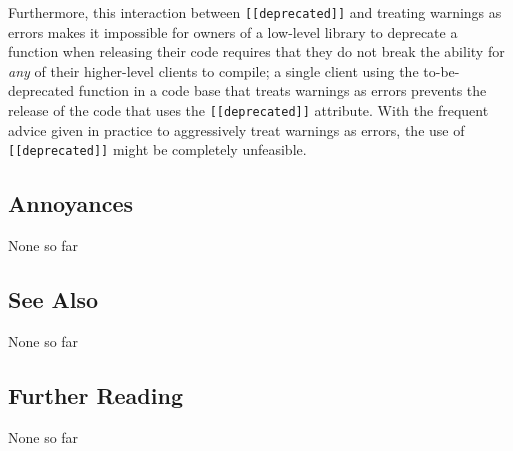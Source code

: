 Furthermore, this interaction between \lstinline![[deprecated]]! and
treating warnings as errors makes it impossible for owners of a low-level library
to deprecate a function when releasing their code requires that they do
not break the ability for \emph{any} of their higher-level clients to compile;
a single client using the to-be-deprecated function in a code base that treats warnings as errors prevents the release of the code that uses the
\lstinline![[deprecated]]! attribute. With the frequent advice given in practice to  aggressively treat warnings as errors, the use of
\lstinline![[deprecated]]! might be completely unfeasible.

\subsection[Annoyances]{Annoyances}\label{annoyances}

None so far

\subsection[See Also]{See Also}\label{see-also}

None so far

\subsection[Further Reading]{Further Reading}\label{further-reading}

None so far



